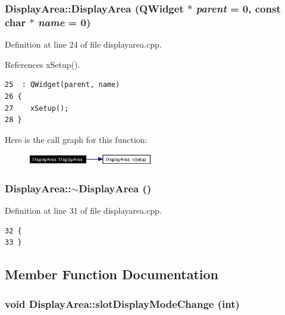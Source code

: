 \subsubsection{\setlength{\rightskip}{0pt plus 5cm}Display\-Area::Display\-Area ({\bf QWidget} $\ast$ {\em parent} = 0, const char $\ast$ {\em name} = 0)}\label{classDisplayArea_DisplayAreaa0}




Definition at line 24 of file displayarea.cpp.

References x\-Setup().



\footnotesize\begin{verbatim}25  : QWidget(parent, name)
26 {
27    xSetup();
28 }
\end{verbatim}\normalsize 


Here is the call graph for this function:\begin{figure}[H]
\begin{center}
\leavevmode
\includegraphics[width=155pt]{classDisplayArea_DisplayAreaa0_cgraph}
\end{center}
\end{figure}
\subsubsection{\setlength{\rightskip}{0pt plus 5cm}Display\-Area::$\sim${\bf Display\-Area} ()}\label{classDisplayArea_DisplayAreaa1}




Definition at line 31 of file displayarea.cpp.



\footnotesize\begin{verbatim}32 {
33 }
\end{verbatim}\normalsize 


\subsection{Member Function Documentation}
\subsubsection{\setlength{\rightskip}{0pt plus 5cm}void Display\-Area::slot\-Display\-Mode\-Change (int)\hspace{0.3cm}{\tt  [slot]}}\label{classDisplayArea_DisplayAreai0}





